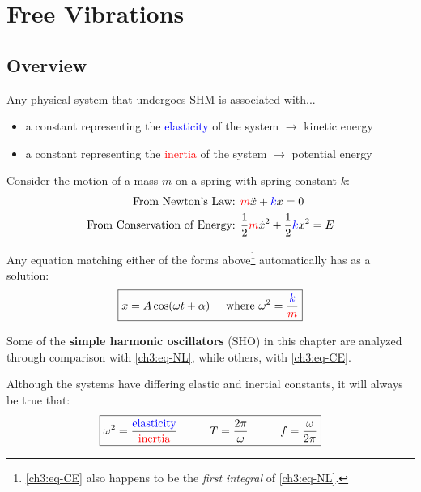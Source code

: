 \documentclass[11pt,letterpaper,titlepage,oneside]{book}
\newcommand{\htab}{\hspace{0.5cm}}
\newcommand{\hhtab}{\htab\htab}
\newcommand{\where}{\htab\text{where }}
\newcommand{\kcol}[1]{\textcolor{blue}{#1}}
\newcommand{\mcol}[1]{\textcolor{red}{#1}}
\begin{document}

\chapter{Free Vibrations}

\section{Overview}
Any physical system that undergoes SHM is associated with...
\begin{itemize}
	\item a constant representing the \kcol{elasticity} of the system $\longrightarrow$ kinetic energy
	\item a constant representing the \mcol{inertia} of the system $\longrightarrow$ potential energy
\end{itemize}

Consider the motion of a mass $m$ on a spring with spring constant $k$:
\begin{align}
	\text{From Newton's Law: }&
	\mcol{m}\ddot{x} + \kcol{k}x = 0 \label{ch3:eq-NL} \\
	\text{From Conservation of Energy: }&
	\frac{1}{2}\mcol{m}\dot{x}^2 + \frac{1}{2}\kcol{k}x^2 = E \label{ch3:eq-CE}
\end{align}

Any equation matching either of the forms above\footnote{\eqref{ch3:eq-CE} also happens to be the \textit{first integral} of  \eqref{ch3:eq-NL}.} automatically has as a solution:
\begin{equation}
\boxed{x = A \cos(\omega t+\alpha)\where\omega^2 = \frac{\kcol{k}}{\mcol{m}}} \label{ch3:eq-SHM-soln}
\end{equation}

Some of the \textbf{simple harmonic oscillators} (SHO) in this chapter are analyzed through comparison with \eqref{ch3:eq-NL}, while others, with \eqref{ch3:eq-CE}.

Although the systems have differing elastic and inertial constants, it will always be true that:
\begin{equation}
	\boxed{
		\omega^2 = \frac{\kcol{\text{elasticity}}}{\mcol{\text{inertia}}} \hhtab 
		T = \frac{2\pi}{\omega} \hhtab 
		f = \frac{\omega}{2\pi}}
\end{equation}
\end{document}
